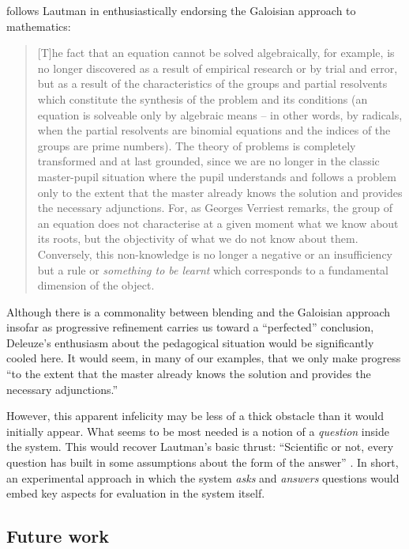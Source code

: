 \cite[pp. 227--228]{deleuze1994difference} follows
Lautman in enthusiastically endorsing the Galoisian approach to
mathematics:
\begin{quote}
[T]he fact that an equation cannot be solved algebraically, for
example, is no longer discovered as a result of empirical research or
by trial and error, but as a result of the characteristics of the
groups and partial resolvents which constitute the synthesis of the
problem and its conditions (an equation is solveable only by algebraic
means -- in other words, by radicals, when the partial resolvents are
binomial equations and the indices of the groups are prime numbers).
The theory of problems is completely transformed and at last grounded,
since we are no longer in the classic master-pupil situation where the
pupil understands and follows a problem only to the extent that the
master already knows the solution and provides the necessary
adjunctions.  For, as Georges Verriest remarks, the group of an
equation does not characterise at a given moment what we know about
its roots, but the objectivity of what we do not know about them.
Conversely, this non-knowledge is no longer a negative or an
insufficiency but a rule or \emph{something to be learnt} which
corresponds to a fundamental dimension of the object.
\end{quote}

Although there is a commonality between blending and the
Galoisian approach insofar as progressive refinement carries us toward a
``perfected'' conclusion, Deleuze's enthusiasm about the pedagogical
situation would be significantly cooled here.  It would seem, in many
of our examples, that we only make progress ``to the extent that the
master already knows the solution and provides the necessary
adjunctions.''

However, this apparent infelicity may be less of a thick obstacle than
it would initially appear.  What seems to be most needed is a notion
of a \emph{question} inside the system.  This would recover Lautman's
basic thrust: ``Scientific or not, every question has built in some
assumptions about the form of the answer'' \cite{larvor2011albert}.
In short, an experimental approach in which the system \emph{asks} and
\emph{answers} questions would embed key aspects for evaluation in the
system itself.

\subsection{Future work}

